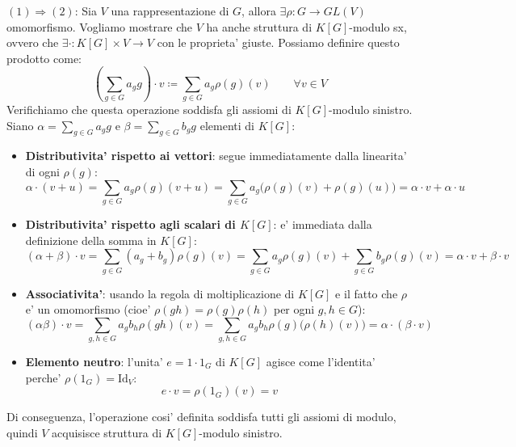 {$(1) \Rightarrow (2)$: Sia $ V $ una rappresentazione di $ G $, allora $ \exists \rho: G \to GL(V) $ omomorfismo. Vogliamo mostrare che $ V $ ha anche struttura di $ K[G] $-modulo sx, ovvero che $ \exists \cdot: K[G] \times V \to V $ con le proprieta' giuste. Possiamo definire questo prodotto come:
\[
  \left(\sum_{g \in G}a_g g\right) \cdot v \coloneq \sum_{g \in G} a_g \rho(g)(v) \qquad \forall v \in V
\]
Verifichiamo che questa operazione soddisfa gli assiomi di $ K[G] $-modulo sinistro. Siano $ \alpha = \sum_{g \in G} a_g g $ e $ \beta = \sum_{g \in G} b_g g $ elementi di $ K[G] $:
\begin{itemize}
\item \textbf{Distributivita' rispetto ai vettori}: segue immediatamente dalla linearita' di ogni $ \rho(g) $:
\[
  \alpha \cdot (v+u) = \sum_{g \in G} a_g \rho(g)(v+u) = \sum_{g \in G} a_g \big(\rho(g)(v) + \rho(g)(u)\big) = \alpha \cdot v + \alpha \cdot u
\]
\item \textbf{Distributivita' rispetto agli scalari di $ K[G] $}: e' immediata dalla definizione della somma in $ K[G] $:
\[
  (\alpha+\beta) \cdot v = \sum_{g \in G}(a_g+b_g)\rho(g)(v) = \sum_{g \in G} a_g \rho(g)(v) + \sum_{g \in G} b_g \rho(g)(v) = \alpha \cdot v + \beta \cdot v
\]
\item \textbf{Associativita'}: usando la regola di moltiplicazione di $ K[G] $ e il fatto che $ \rho $ e' un omomorfismo (cioe' $ \rho(gh) = \rho(g)\rho(h) $ per ogni $ g,h \in G $):
\[
  (\alpha\beta) \cdot v = \sum_{g,h \in G} a_g b_h \rho(gh)(v) = \sum_{g,h \in G} a_g b_h \rho(g)\big(\rho(h)(v)\big) = \alpha \cdot (\beta \cdot v)
\]
\item \textbf{Elemento neutro}: l'unita' $ e = 1 \cdot 1_G $ di $ K[G] $ agisce come l'identita' perche' $ \rho(1_G) = \mathrm{Id}_V $:
\[
  e \cdot v = \rho(1_G)(v) = v
\]
\end{itemize}
Di conseguenza, l'operazione cosi' definita soddisfa tutti gli assiomi di modulo, quindi $ V $ acquisisce struttura di $ K[G] $-modulo sinistro.
}


